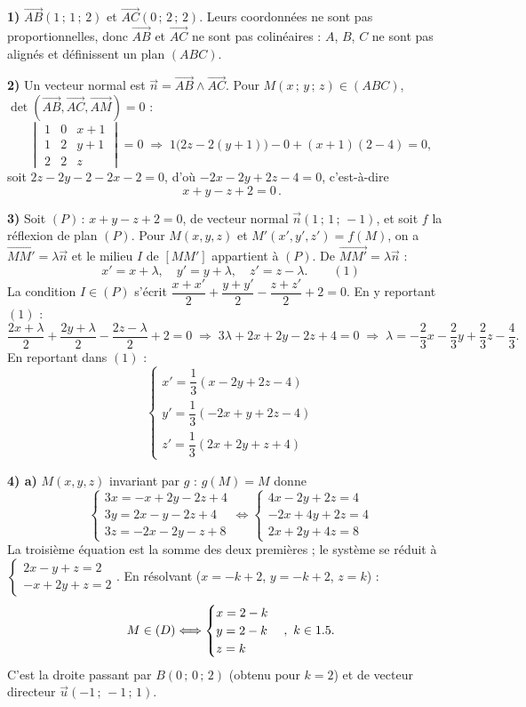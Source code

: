 \noindent\textbf{1)} $\overrightarrow{AB}(1\,;\,1\,;\,2)$ et $\overrightarrow{AC}(0\,;\,2\,;\,2)$.
Leurs coordonnées ne sont pas proportionnelles, donc $\overrightarrow{AB}$ et
$\overrightarrow{AC}$ ne sont pas colinéaires : $A$, $B$, $C$ ne sont pas alignés et définissent
un plan $(ABC)$.

\noindent\textbf{2)} Un vecteur normal est $\vec n=\overrightarrow{AB}\wedge\overrightarrow{AC}$.
Pour $M(x\,;\,y\,;\,z)\in(ABC)$, $\det(\overrightarrow{AB},\overrightarrow{AC},\overrightarrow{AM})=0$ :
\[
\begin{vmatrix}1&0&x+1\\ 1&2&y+1\\ 2&2&z\end{vmatrix}=0
\;\Longrightarrow\;1\bigl(2z-2(y+1)\bigr)-0+(x+1)(2-4)=0,
\]
soit $2z-2y-2-2x-2=0$, d'où $-2x-2y+2z-4=0$, c'est-à-dire
\[
\boxed{\,x+y-z+2=0\,}.
\]

\noindent\textbf{3)} Soit $(P)\,:\,x+y-z+2=0$, de vecteur normal $\vec n(1\,;\,1\,;\,-1)$, et soit
$f$ la réflexion de plan $(P)$. Pour $M(x,y,z)$ et $M'(x',y',z')=f(M)$, on a
$\overrightarrow{MM'}=\lambda\vec n$ et le milieu $I$ de $[MM']$ appartient à $(P)$. De
$\overrightarrow{MM'}=\lambda\vec n$ :
\[
x'=x+\lambda,\quad y'=y+\lambda,\quad z'=z-\lambda.\qquad(1)
\]
La condition $I\in(P)$ s'écrit $\dfrac{x+x'}{2}+\dfrac{y+y'}{2}-\dfrac{z+z'}{2}+2=0$. En y
reportant $(1)$ :
\[
\frac{2x+\lambda}{2}+\frac{2y+\lambda}{2}-\frac{2z-\lambda}{2}+2=0
\;\Longrightarrow\;3\lambda+2x+2y-2z+4=0
\;\Longrightarrow\;\lambda=-\frac23x-\frac23y+\frac23z-\frac43.
\]
En reportant dans $(1)$ :
\[
\boxed{\;
\begin{cases}
x'=\dfrac13(x-2y+2z-4)\\[4pt]
y'=\dfrac13(-2x+y+2z-4)\\[4pt]
z'=\dfrac13(2x+2y+z+4)
\end{cases}\;}
\]

\noindent\textbf{4) a)} $M(x,y,z)$ invariant par $g$ : $g(M)=M$ donne
\[
\begin{cases}3x=-x+2y-2z+4\\ 3y=2x-y-2z+4\\ 3z=-2x-2y-z+8\end{cases}
\Longleftrightarrow
\begin{cases}4x-2y+2z=4\\ -2x+4y+2z=4\\ 2x+2y+4z=8\end{cases}
\]
La troisième équation est la somme des deux premières ; le système se réduit à
$\begin{cases}2x-y+z=2\\ -x+2y+z=2\end{cases}$. En résolvant ($x=-k+2$, $y=-k+2$, $z=k$) :
\[
M\in(D)\Longleftrightarrow
\begin{cases}x=2-k\\ y=2-k\\ z=k\end{cases},\ k\in1.5.
\]
C'est la droite passant par $B(0\,;\,0\,;\,2)$ (obtenu pour $k=2$) et de vecteur directeur
$\vec u(-1\,;\,-1\,;\,1)$.

